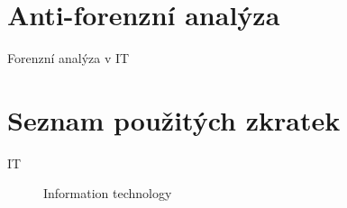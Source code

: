\documentclass[thesis=B,czech]{FITthesis}[2012/06/26]
\begin{document}
\chapter{Anti-forenzní analýza}








  
\begin{conclusion}
 Forenzní analýza v IT
\end{conclusion}




\appendix

\chapter{Seznam použitých zkratek}
\begin{description}

    \item[IT] Information technology


\end{description}
\end{document}
